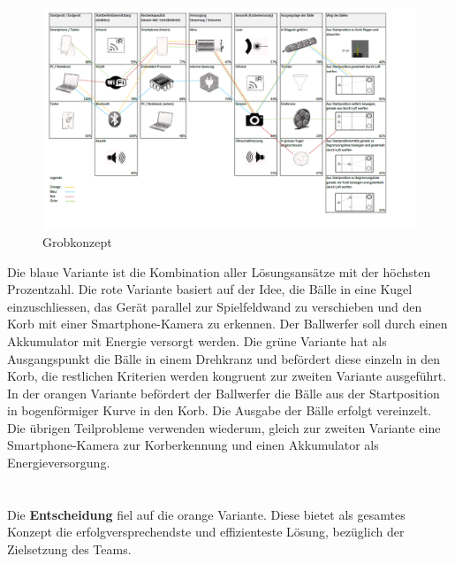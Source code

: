 \\
\newpage
\begin{figure}[h!]
	\centering
	\includegraphics[width=1\textwidth]{Enddokumentation/Varianten/Bilder/Grobkonzept.png}
	\caption{Grobkonzept}
	\label{fig:Grobkonzept}
\end{figure}


Die blaue Variante ist die Kombination aller Lösungsansätze mit der höchsten Prozentzahl. Die rote Variante basiert auf der Idee, die Bälle in eine Kugel einzuschliessen, das Gerät parallel zur Spielfeldwand zu verschieben und den Korb mit einer Smartphone-Kamera zu erkennen. Der Ballwerfer soll durch einen Akkumulator mit Energie versorgt werden. Die grüne Variante hat als Ausgangspunkt die Bälle in einem Drehkranz und befördert diese einzeln in den Korb, die restlichen Kriterien werden kongruent zur zweiten Variante ausgeführt. In der orangen Variante befördert der Ballwerfer die Bälle aus der Startposition in bogenförmiger Kurve in den Korb. Die Ausgabe der Bälle erfolgt vereinzelt. Die übrigen Teilprobleme verwenden wiederum, gleich zur zweiten Variante eine Smartphone-Kamera zur Korberkennung und einen Akkumulator als Energieversorgung.\\
\\\\
Die \textbf{Entscheidung} fiel auf die orange Variante. Diese bietet als gesamtes Konzept die erfolgversprechendste und effizienteste Lösung, bezüglich der Zielsetzung des Teams. \\

